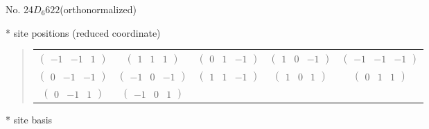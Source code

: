 \documentclass[fleqn,9pt,landscape]{jsarticle}
\begin{document}
\newpage
\begin{center}
\LARGE
No. 24\quad$D_{6}$\quad$622$\quad[ hexagonal ] (orthonormalized)
\end{center}
\vspace{5mm}
* site positions (reduced coordinate)
\begin{quote}
\begin{tabular}{ccccc}
$ \begin{pmatrix} -1 & -1 & 1 \end{pmatrix} $ & $ \begin{pmatrix} 1 & 1 & 1 \end{pmatrix} $ & $ \begin{pmatrix} 0 & 1 & -1 \end{pmatrix} $ & $ \begin{pmatrix} 1 & 0 & -1 \end{pmatrix} $ & $ \begin{pmatrix} -1 & -1 & -1 \end{pmatrix} $ \\
$ \begin{pmatrix} 0 & -1 & -1 \end{pmatrix} $ & $ \begin{pmatrix} -1 & 0 & -1 \end{pmatrix} $ & $ \begin{pmatrix} 1 & 1 & -1 \end{pmatrix} $ & $ \begin{pmatrix} 1 & 0 & 1 \end{pmatrix} $ & $ \begin{pmatrix} 0 & 1 & 1 \end{pmatrix} $ \\
$ \begin{pmatrix} 0 & -1 & 1 \end{pmatrix} $ & $ \begin{pmatrix} -1 & 0 & 1 \end{pmatrix} $ & $  $ & $  $ & $  $
\end{tabular}
\end{quote}
* site basis
\end{document}
